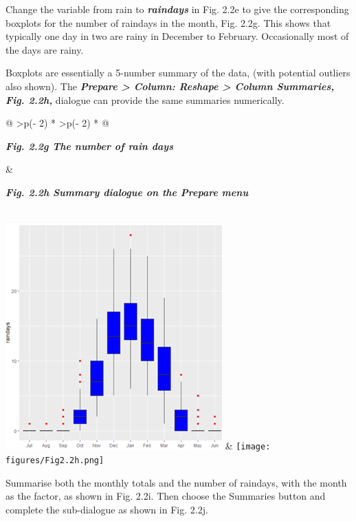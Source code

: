 \documentclass[
  letterpaper,
  DIV=11,
  numbers=noendperiod]{scrreprt}
\begin{document}
Change the variable from rain to \textbf{\emph{raindays}} in Fig. 2.2e
to give the corresponding boxplots for the number of raindays in the
month, Fig. 2.2g. This shows that typically one day in two are rainy in
December to February. Occasionally most of the days are rainy.

Boxplots are essentially a 5-number summary of the data, (with potential
outliers also shown). The \textbf{\emph{Prepare \textgreater{} Column:
Reshape \textgreater{} Column Summaries, Fig. 2.2h,}} dialogue can
provide the same summaries numerically.

\begin{longtable}[]{@{}
  >{\centering\arraybackslash}p{(\columnwidth - 2\tabcolsep) * }
  >{\centering\arraybackslash}p{(\columnwidth - 2\tabcolsep) * }@{}}
\toprule\noalign{}
\begin{minipage}[b]{\linewidth}\centering
\textbf{\emph{Fig. 2.2g The number of rain days}}
\end{minipage} & \begin{minipage}[b]{\linewidth}\centering
\textbf{\emph{Fig. 2.2h Summary dialogue on the Prepare menu}}
\end{minipage} \\
\midrule\noalign{}
\endhead
\bottomrule\noalign{}
\endlastfoot
\includegraphics[width=3.281in,height=3.44in]{figures/Fig2.2g.png} &
\texttt{[image: figures/Fig2.2h.png]} \\
\end{longtable}

Summarise both the monthly totals and the number of raindays, with the
month as the factor, as shown in Fig. 2.2i. Then choose the Summaries
button and complete the sub-dialogue as shown in Fig. 2.2j.
\end{document}
